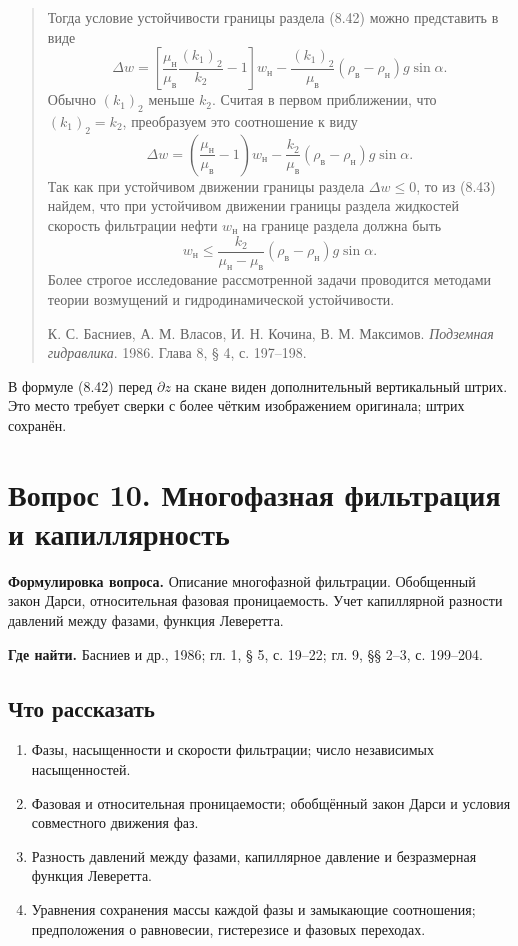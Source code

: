 \documentclass[12pt,a4paper]{article}
\newcounter{questionnumber}
\begin{document}
\begin{quote}
Тогда условие устойчивости границы раздела (8.42) можно представить в виде
\[
\Delta w=\left[\frac{\mu_\text{н}}{\mu_\text{в}}\frac{(k_1)_2}{k_2}-1\right]w_\text{н}-\frac{(k_1)_2}{\mu_\text{в}}(\rho_\text{в}-\rho_\text{н})g\sin\alpha.
\]
Обычно $(k_1)_2$ меньше $k_2$. Считая в первом приближении, что $(k_1)_2=k_2$, преобразуем это соотношение к виду
\begin{equation}\Delta w=\left(\frac{\mu_\text{н}}{\mu_\text{в}}-1\right)w_\text{н}-\frac{k_2}{\mu_\text{в}}(\rho_\text{в}-\rho_\text{н})g\sin\alpha.\tag{8.43}\label{q9:eq-8-43}\end{equation}
Так как при устойчивом движении границы раздела $\Delta w\le0$, то из (8.43) найдем, что при устойчивом движении границы раздела жидкостей скорость фильтрации нефти $w_\text{н}$ на границе раздела должна быть
\[
w_\text{н}\le\frac{k_2}{\mu_\text{н}-\mu_\text{в}}(\rho_\text{в}-\rho_\text{н})g\sin\alpha.
\]
Более строгое исследование рассмотренной задачи проводится методами теории возмущений и гидродинамической устойчивости.
\par\nobreak\smallskip
{\small К. С. Басниев, А. М. Власов, И. Н. Кочина, В. М. Максимов. \textit{Подземная гидравлика}. 1986. Глава 8, § 4, с. 197--198.}\par
\end{quote}

\noindent В формуле (8.42) перед $\partial z$ на скане виден дополнительный вертикальный штрих. Это место требует сверки с более чётким изображением оригинала; штрих сохранён.
\endgroup

\clearpage
\setcounter{questionnumber}{10}
\setcounter{equation}{0}
\setcounter{footnote}{0}
\section*{Вопрос 10. Многофазная фильтрация и капиллярность}
\textbf{Формулировка вопроса.} Описание многофазной фильтрации. Обобщенный закон Дарси, относительная фазовая проницаемость. Учет капиллярной разности давлений между фазами, функция Леверетта.

\medskip
\textbf{Где найти.} Басниев и др., 1986; гл. 1, § 5, с. 19--22; гл. 9, §§ 2--3, с. 199--204.

\subsection*{Что рассказать}
\begin{enumerate}
\item Фазы, насыщенности и скорости фильтрации; число независимых насыщенностей.
\item Фазовая и относительная проницаемости; обобщённый закон Дарси и условия совместного движения фаз.
\item Разность давлений между фазами, капиллярное давление и безразмерная функция Леверетта.
\item Уравнения сохранения массы каждой фазы и замыкающие соотношения; предположения о равновесии, гистерезисе и фазовых переходах.
\end{enumerate}
\end{document}
